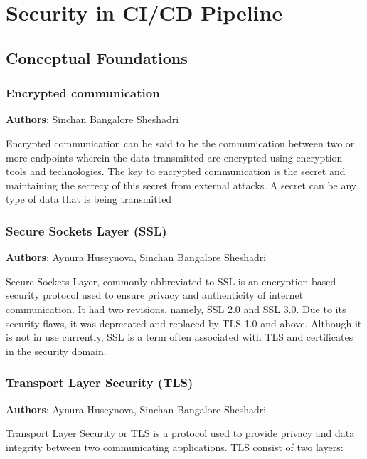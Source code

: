 \section{Security in CI/CD Pipeline}

\subsection{Conceptual Foundations}

\subsubsection{Encrypted communication}

\textbf{Authors}: Sinchan Bangalore Sheshadri

Encrypted communication can be said to be the communication between two or more endpoints wherein the data transmitted are encrypted using encryption tools and technologies. The key to encrypted communication is the secret and maintaining the secrecy of this secret from external attacks. A secret can be any type of data that is being transmitted

\subsubsection{Secure Sockets Layer (SSL)}
\textbf{Authors}: Aynura Huseynova, Sinchan Bangalore Sheshadri

Secure Sockets Layer, commonly abbreviated to SSL is an encryption-based security protocol used to ensure privacy and authenticity of internet communication. It had two revisions, namely, SSL 2.0 and SSL 3.0. Due to its security flaws, it was deprecated and replaced by TLS 1.0 and above. Although it is not in use currently, SSL is a term often associated with TLS and certificates in the security domain.\footnotemark




\subsubsection{Transport Layer Security (TLS)}
\textbf{Authors}: Aynura Huseynova, Sinchan Bangalore Sheshadri

Transport Layer Security or TLS is a protocol used to provide privacy and data integrity between two communicating applications. TLS consist of two layers:


